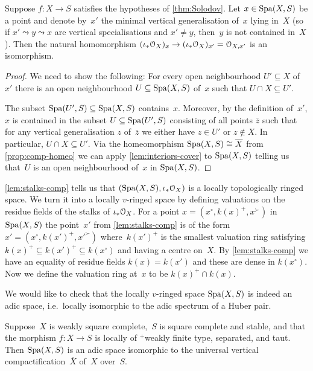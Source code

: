 \begin{lem} \label{lem:stalks-comp}
    Suppose $f \colon X \to S$ satisfies the hypotheses of \cref{thm:Solodov}.
    Let $x \in \operatorname{Spa}(X,S)$ be a point and denote by~$x'$ the minimal vertical generalisation of~$x$ lying in~$X$ (so if $x' \leadsto y \leadsto x$ are vertical specialisations and $x' \ne y$, then~$y$ is not contained in~$X$).
    Then the natural homomorphism $(\iota_*{\mathcal O}_X)_x \to (\iota_*{\mathcal O}_X)_{x'} = {\mathcal O}_{X,x'}$ is an isomorphism.
\end{lem}

\begin{proof}
    We need to show the following:
    For every open neighbourhood $U' \subseteq X$ of~$x'$ there is an open neighbourhood $U \subseteq \operatorname{Spa}(X,S)$ of~$x$ such that $U \cap X \subseteq U'$.

    The subset $\operatorname{Spa}(U',S) \subseteq \operatorname{Spa}(X,S)$ contains~$x$.
    Moreover, by the definition of~$x'$, $x$ is contained in the subset $U \subseteq \operatorname{Spa}(U',S)$ consisting of all points $\bar{z}$ such that for any vertical generalisation $z$ of~$\bar{z}$ we either have $z \in U'$ or $z \notin X$.
    In particular, $U \cap X \subseteq U'$.
    Via the homeomorphism $\operatorname{Spa}(X,S) \cong \overline{X}$ from \cref{prop:comp-homeo} we can apply \cref{lem:interiors-cover} to $\operatorname{Spa}(X,S)$ telling us that~$U$ is an open neighbourhood of~$x$ in $\operatorname{Spa}(X,S)$.
\end{proof}

\cref{lem:stalks-comp} tells us that $(\operatorname{Spa}(X,S),\iota_*{\mathcal O}_X)$ is a locally topologically ringed space.
We turn it into a locally $v$-ringed space by defining valuations on the residue fields of the stalks of $\iota_*{\mathcal O}_X$.
For a point $x = (x^\circ,k(x)^+,x^\succ)$ in $\operatorname{Spa}(X,S)$ the point~$x'$ from \cref{lem:stalks-comp} is of the form $x' = (x^\circ,k(x')^+,x'^\succ)$ where~$k(x')^+$ is the smallest valuation ring satisfying $k(x)^+ \subseteq k(x')^+ \subseteq k(x^\circ)$ and having a centre on~$X$.
By \cref{lem:stalks-comp} we have an equality of residue fields $k(x) = k(x')$ and these are dense in $k(x^\circ)$.
Now we define the valuation ring at~$x$ to be $k(x)^+ \cap k(x)$.

We would like to check that the locally $v$-ringed space $\operatorname{Spa}(X,S)$ is indeed an adic space, i.e.~locally isomorphic to the adic spectrum of a Huber pair.

\begin{thm} \label{thm:Solodov-comp}
    Suppose~$X$ is weakly square complete,~$S$ is square complete and stable, and that the morphism $f \colon X \to S$ is locally of ${}^+$weakly finite type, separated, and taut.
    Then $\operatorname{Spa}(X,S)$ is an adic space isomorphic to the universal vertical compactification~$\overline{X}$ of~$X$ over~$S$.
\end{thm}

